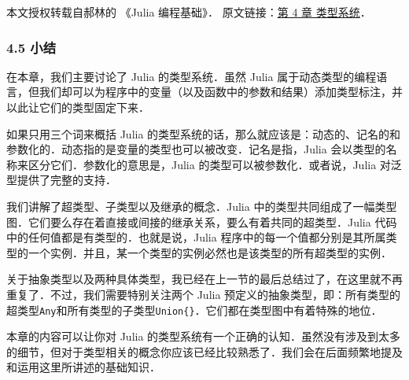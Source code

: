 
本文授权转载自郝林的 《Julia 编程基础》． 原文链接：\href{https://github.com/hyper0x/JuliaBasics/blob/master/book/ch04.md}{第 4 章 类型系统}．


\subsubsection{4.5 小结}

在本章，我们主要讨论了 Julia 的类型系统．虽然 Julia 属于动态类型的编程语言，但我们却可以为程序中的变量（以及函数中的参数和结果）添加类型标注，并以此让它们的类型固定下来．

如果只用三个词来概括 Julia 的类型系统的话，那么就应该是：动态的、记名的和参数化的．动态指的是变量的类型也可以被改变．记名是指，Julia 会以类型的名称来区分它们．参数化的意思是，Julia 的类型可以被参数化．或者说，Julia 对泛型提供了完整的支持．

我们讲解了超类型、子类型以及继承的概念．Julia 中的类型共同组成了一幅类型图．它们要么存在着直接或间接的继承关系，要么有着共同的超类型．Julia 代码中的任何值都是有类型的．也就是说，Julia 程序中的每一个值都分别是其所属类型的一个实例．并且，某一个类型的实例必然也是该类型的所有超类型的实例．

关于抽象类型以及两种具体类型，我已经在上一节的最后总结过了，在这里就不再重复了．不过，我们需要特别关注两个 Julia 预定义的抽象类型，即：所有类型的超类型\verb|Any|和所有类型的子类型\verb|Union{}|．它们都在类型图中有着特殊的地位．

本章的内容可以让你对 Julia 的类型系统有一个正确的认知．虽然没有涉及到太多的细节，但对于类型相关的概念你应该已经比较熟悉了．我们会在后面频繁地提及和运用这里所讲述的基础知识．